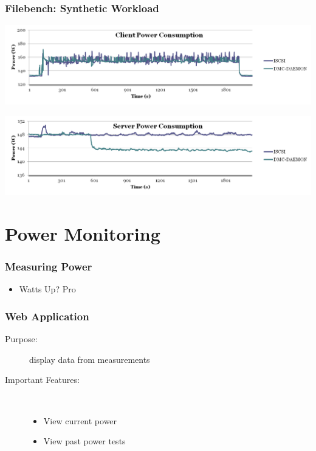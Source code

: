 \documentclass{beamer}
\begin{document}
\begin{frame}
\end{frame}

\begin{frame}
  \frametitle{Filebench: Synthetic Workload}

  \includegraphics[height=0.4\textheight,width=\textwidth,keepaspectratio]{client-power.png}

  \includegraphics[height=0.4\textheight,width=\textwidth,keepaspectratio]{server-power.png}

\end{frame}

\section{Power Monitoring}

\begin{frame}
  \frametitle{Measuring Power}

  \begin{itemize}
    \item Watts Up? Pro
  \end{itemize}

\end{frame}

\begin{frame}
  \frametitle{Web Application}

  \begin{description}
    \item[Purpose:] display data from measurements
    \item[Important Features:] \hfill \\
    \begin{itemize}
      \item View current power
      \item View past power tests
    \end{itemize}
  \end{description}

\end{frame}
\end{document}
